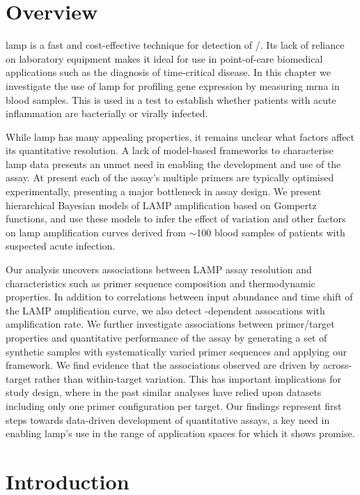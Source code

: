 \documentclass[../thesis.tex]{subfiles}
\begin{document}
\section{Overview}
\Gls{lamp} is a fast and cost-effective technique for detection of /. Its lack of reliance on laboratory equipment makes it ideal for use in point-of-care biomedical applications such as the diagnosis of time-critical disease. In this chapter we investigate the use of \gls{lamp} for profiling gene expression by measuring \gls{mrna} in blood samples. This is used in a test to establish whether patients with acute inflammation are bacterially or virally infected.  

While \gls{lamp} has many appealing properties, it remains unclear what factors affect its quantitative resolution. A lack of model-based frameworks to characterise \gls{lamp} data presents an unmet need in enabling the development and use of the assay. At present each of the assay's multiple primers are typically optimised experimentally, presenting a major bottleneck in assay design.  
We present hierarchical Bayesian models of LAMP amplification based on Gompertz functions, and use these models to infer the effect of  variation and other factors on \gls{lamp} amplification curves derived from $\sim$100 blood samples of patients with suspected acute infection. 

Our analysis uncovers associations between LAMP assay resolution and characteristics such as primer sequence composition and thermodynamic properties. In addition to correlations between  input abundance and time shift of the LAMP amplification curve, we also detect -dependent assocations with amplification rate.  We further investigate associations between primer/target properties and quantitative performance of the assay by generating a set of synthetic  samples with systematically varied primer sequences and applying our framework. We find evidence that the associations observed are driven by across-target rather than within-target variation. This has important implications for study design, where in the past similar analyses have relied upon datasets including only one primer configuration per target. Our findings represent first steps towards data-driven development of quantitative assays, a key need in enabling \gls{lamp}'s use in the range of application spaces for which it shows promise.


\section{Introduction \label{sec:intro}}
\end{document}
